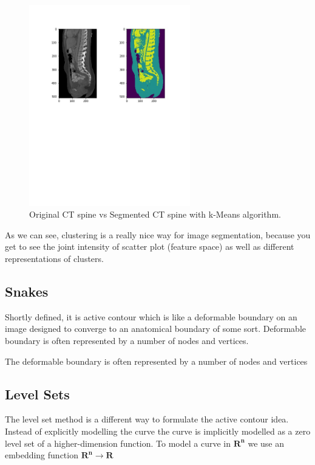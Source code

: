 \newpage
\begin{figure}[h]
    \centering \includegraphics[width=7cm]{images/ct-spine-k-means-segmented.jpg}
    \vspace*{-40mm} \caption {Original CT spine vs Segmented CT spine with k-Means algorithm.}
\end{figure}    

As we can see, clustering is a really nice way for image segmentation, because you get to see the joint intensity of scatter plot (feature space) as well as different representations of clusters.  

\subsection{Snakes}
Shortly defined, it is active contour which is like a deformable boundary on an image designed to converge to an anatomical boundary of some sort. Deformable boundary is often represented by a number of nodes and vertices.  

The deformable boundary is often represented by a number of nodes and vertices  



\subsection{Level Sets}
The level set method is a different way to formulate the active contour idea. Instead of explicitly modelling the curve the curve is implicitly modelled as a zero level set of a higher-dimension function. To model a curve in $\mathbf{R^n}$ we use an embedding function $\mathbf{R^n} \to \mathbf{R}$    


